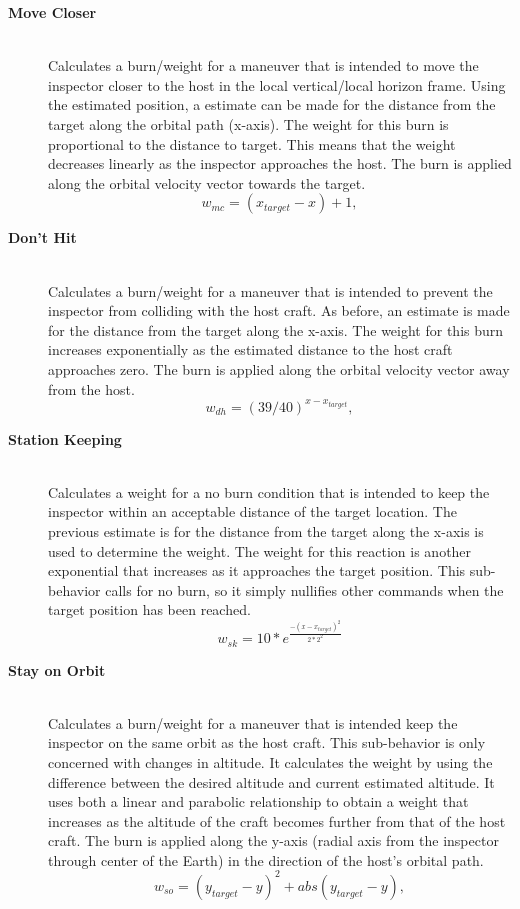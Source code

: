 \documentclass[journal, 10pt]{IEEEtran}
\begin{document}
\begin{description}
\item[\textbf{Move Closer}] \hfill \\
Calculates a burn/weight for a maneuver that is intended to move the inspector closer to the host in the local vertical/local horizon frame.  Using the estimated position, a estimate can be made for the distance from the target along the orbital path (x-axis).  The weight for this burn is proportional to the distance to target.  This means that the weight decreases linearly as the inspector approaches the host.  The burn is applied along the orbital velocity vector towards the target.
\begin{equation}
w_{mc} = (x_{target}-x)+1,
\end{equation}

\item[\textbf{Don't Hit}] \hfill \\
Calculates a burn/weight for a maneuver that is intended to prevent the inspector from colliding with the host craft.  As before, an estimate is made for the distance from the target along the x-axis.  The weight for this burn increases exponentially as the estimated distance to the host craft approaches zero.  The burn is applied along the orbital velocity vector away from the host.
\begin{equation}
w_{dh} = (39/40)^{x-x_{target}},
\end{equation}

\item[\textbf{Station Keeping}] \hfill \\
Calculates a weight for a no burn condition that is intended to keep the inspector within an acceptable distance of the target location.  The previous estimate is for the distance from the target along the x-axis is used to determine the weight.  The weight for this reaction is another exponential that increases as it approaches the target position.  This sub-behavior calls for no burn, so it simply nullifies other commands when the target position has been reached.
\begin{equation}
w_{sk} = 10*e^{\frac{-(x-x_{target})^2}{2*2^2}}
\end{equation}

\item[\textbf{Stay on Orbit}] \hfill \\
Calculates a burn/weight for a maneuver that is intended keep the inspector on the same orbit as the host craft.  This sub-behavior is only concerned with changes in altitude.  It calculates the weight by using the difference between the desired altitude and current estimated altitude.  It uses both a linear and parabolic relationship to obtain a weight that increases as the altitude of the craft becomes further from that of the host craft.  The burn is applied along the y-axis (radial axis from the inspector through center of the Earth) in the direction of the host's orbital path.
\begin{equation}
w_{so} = (y_{target}-y)^2+abs(y_{target}-y),
\end{equation}


\end{description}
\end{document}
